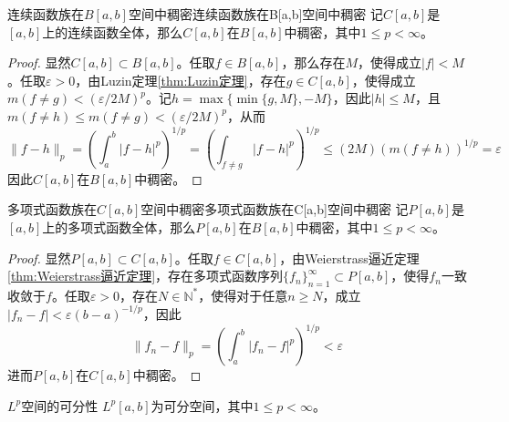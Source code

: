 \documentclass[lang = cn, scheme = chinese, thmcnt = section]{elegantbook}
\begin{document}
\begin{lemma}{连续函数族在$B[a,b]$空间中稠密}{连续函数族在B[a,b]空间中稠密}
	记$C[a,b]$是$[a,b]$上的连续函数全体，那么$C[a,b]$在$B[a,b]$中稠密，其中$1\le p<\infty$。
\end{lemma}

\begin{proof}
	显然$C[a,b]\subset B[a,b]$。任取$f\in B[a,b]$，那么存在$M$，使得成立$|f|<M$。任取$\varepsilon>0$，由Luzin定理\ref{thm:Luzin定理}，存在$g\in C[a,b]$，使得成立$m(f\ne g)<(\varepsilon/2M)^p$。记$h=\max\{ \min\{g,M\},-M \}$，因此$|h|\le M$，且$m(f\ne h)\le m(f\ne g )<(\varepsilon/2M)^p$，从而
	$$
	\|f-h\|_p
	=\left(\int_a^b|f-h|^p\right)^{1/p}
	=\left(\int_{f\ne g}|f-h|^p\right)^{1/p}
	\le (2M)(m(f\ne h))^{1/p}=\varepsilon
	$$
	因此$C[a,b]$在$B[a,b]$中稠密。
\end{proof}

\begin{lemma}{多项式函数族在$C[a,b]$空间中稠密}{多项式函数族在C[a,b]空间中稠密}
	记$P[a,b]$是$[a,b]$上的多项式函数全体，那么$P[a,b]$在$B[a,b]$中稠密，其中$1\le p<\infty$。
\end{lemma}

\begin{proof}
	显然$P[a,b]\subset C[a,b]$。任取$f\in C[a,b]$，由Weierstrass逼近定理\ref{thm:Weierstrass逼近定理}，存在多项式函数序列$\{f_n\}_{n=1}^{\infty}\subset P[a,b]$，使得$f_n$一致收敛于$f$。任取$\varepsilon>0$，存在$N\in\mathbb{N}^*$，使得对于任意$n\ge N$，成立$|f_n-f|<\varepsilon(b-a)^{-1/p}$，因此
	$$
	\|f_n-f\|_p=\left(\int_a^b|f_n-f|^p\right)^{1/p}<\varepsilon
	$$
	进而$P[a,b]$在$C[a,b]$中稠密。
\end{proof}

\begin{theorem}{$L^p$空间的可分性}
	$L^p[a,b]$为可分空间，其中$1\le p<\infty$。
\end{theorem}
\end{document}
